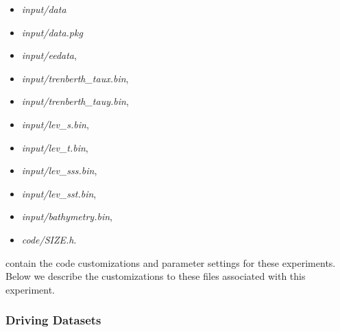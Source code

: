 \begin{itemize}
\item {\it input/data}
\item {\it input/data.pkg}
\item {\it input/eedata},
\item {\it input/trenberth\_taux.bin},
\item {\it input/trenberth\_tauy.bin},
\item {\it input/lev\_s.bin},
\item {\it input/lev\_t.bin},
\item {\it input/lev\_sss.bin},
\item {\it input/lev\_sst.bin},
\item {\it input/bathymetry.bin},
\item {\it code/SIZE.h}. 
\end{itemize}
contain the code customizations and parameter settings for these
experiments. Below we describe the customizations
to these files associated with this experiment.

\subsubsection{Driving Datasets}





